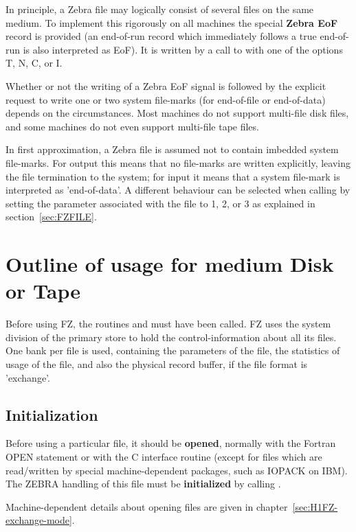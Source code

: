 In principle, a Zebra file may logically consist of several
files on the same medium.
To implement this rigorously on all machines the special
\textbf{Zebra EoF} record is provided
(an end-of-run record which immediately follows a true end-of-run
is also interpreted as EoF).
It is written by a call to  with one of the options
T, N, C, or I.

Whether or not the writing of a Zebra EoF signal is followed
by the explicit request to write one or two system file-marks
(for end-of-file or end-of-data)
depends on the circumstances.
Most machines do not support multi-file disk files,
and some machines do not even support multi-file tape files.

In first approximation, a Zebra file is assumed not to
contain imbedded system file-marks.
For output this means that no file-marks are written explicitly,
leaving the file termination to the system;
for input it means that a system file-mark is interpreted
as 'end-of-data'.
A different behaviour can be selected when calling 
by setting the  parameter associated with the file
to 1, 2, or 3  as explained in section~\ref{sec:FZFILE}.

\section{Outline of usage for medium Disk or Tape}

Before using FZ, the routines  and 
 must have been called.
FZ uses the system division of the primary store to hold
the control-information about all its files.
One bank per file is used, containing the parameters of the file,
the statistics of usage of the file,
and also the physical record buffer,
if the file format is 'exchange'.

\subsection*{Initialization}

Before using a particular file,
it should be \textbf{opened},
normally with the Fortran OPEN statement
or with the C interface routine 
(except for files which are read/written by special
machine-dependent packages, such as IOPACK on IBM).
The ZEBRA handling of this file must be \textbf{initialized}
by calling .

Machine-dependent details about opening files are given in 
chapter~\ref{sec:H1FZ-exchange-mode}.

